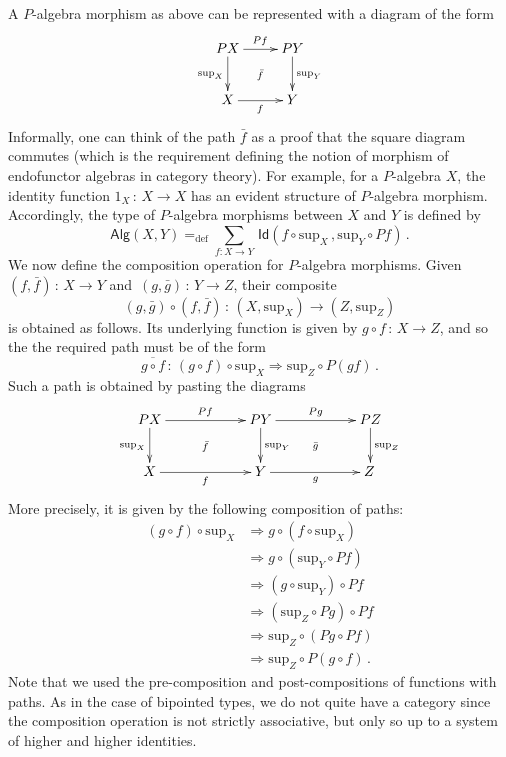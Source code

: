 \documentclass[10pt,a4paper,oneside,reqno]{amsart}
\theoremstyle{mythm}
\theoremstyle{mydef}
\theoremstyle{myrmk}
\newcommand{\defeq}{=_{\mathrm{def}}}
\newcommand{\co}{\,{:}\,}
\newcommand{\Id}{\mathsf{Id}}
\newcommand{\Palg}{\mathsf{Alg}}
\renewcommand{\sup}{\mathrm{sup}}
\begin{document}
A $P$-algebra morphism as above can be represented with a diagram of the form
\[
\xymatrix{
 PX \ar[d]_{\sup_X} \ar[r]^{Pf}  \ar@{}[dr]|{\bar{f}} &  PY \ar[d]^{\sup_Y}\\
X \ar[r]_{f}   & Y }
\] 
Informally, one can think of the path $\bar{f}$ as a proof that the square diagram commutes (which is the 
requirement defining the notion of morphism of endofunctor algebras in category theory). For example, for a $P$-algebra $X$, 
the identity function $1_X \co X \to X$ has an evident structure of $P$-algebra morphism. Accordingly, the type of $P$-algebra 
morphisms between $X$ and $Y$ is defined by
\[
\Palg(X,Y)
 \defeq  
\sum_{f:  X \rightarrow Y} \, \Id(f\circ \sup_X \, ,  \sup_Y \circ P f )  \, .
\]
We now define the composition operation for $P$-algebra morphisms. Given $(f, \bar{f}) \co X \to Y$ and~$(g, \bar{g}) \co Y \to Z$,
their composite 
\[
(g, \bar{g}) \circ (f, \bar{f}) \co (X, \sup_X) \to (Z, \sup_Z)
\] 
is obtained as follows. Its underlying function is given by $g\circ f\co X \to Z$, and so the 
the required path must be of the form
\[
 \overline{ g \circ f} \co (g\circ f) \circ \sup_X \Rightarrow \sup_Z \circ P(gf)\, .
\]
Such a path is obtained by pasting the diagrams 
\[
\xymatrix@C=2cm{
 PX \ar[d]_{\sup_X} \ar[r]^{Pf}  \ar@{}[dr]|{\bar{f}} &  PY \ar[d]^{\sup_Y}  \ar[r]^{Pg}  \ar@{}[dr]|{\bar{g}} &  PZ \ar[d]^{\sup_Z} \\
X \ar[r]_{f}   & Y \ar[r]_{g}   & Z \,  }
\]
More precisely, it is given by the following composition of paths:
\begin{align*}
(g\circ f) \circ \sup_X &  \Rightarrow g \circ (f \circ \sup_X) \\
 & \Rightarrow g \circ ( \sup_Y \circ P f ) \\
 & \Rightarrow (g \circ \sup_Y) \circ Pf \\
 & \Rightarrow (\sup_Z \circ Pg) \circ Pf \\
 & \Rightarrow \sup_Z \circ (Pg \circ Pf) \\
 & \Rightarrow \sup_Z \circ P (g\circ f) \, .
 \end{align*}
Note that we used the pre-composition and post-compositions of functions with paths. As in the case of bipointed types, we do not quite have a category since the composition operation is not strictly associative, but only so up to a system of higher and higher identities. 

\medskip
\end{document}
